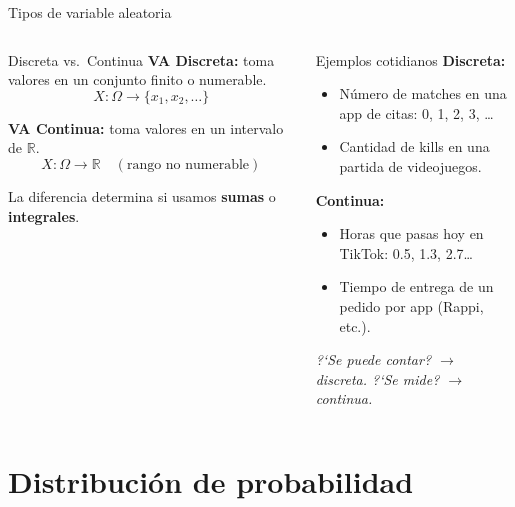 \documentclass[aspectratio=169, 11pt]{beamer}
\begin{document}
\begin{frame}{Tipos de variable aleatoria}
\begin{columns}[T]
\begin{block}{Discreta vs.\ Continua}
\textbf{VA Discreta:} toma valores en un conjunto finito o numerable.
\[
  X: \Omega \to \{x_1, x_2, \dots\}
\]

\vspace{0.3em}
\textbf{VA Continua:} toma valores en un intervalo de $\mathbb{R}$.
\[
  X: \Omega \to \mathbb{R} \quad (\text{rango no numerable})
\]

\vspace{0.3em}
La diferencia determina si usamos \textbf{sumas} o \textbf{integrales}.
\end{block}

\begin{exampleblock}{Ejemplos cotidianos}
\textbf{Discreta:}
\begin{itemize}
  \item N\'umero de matches en una app de citas: 0, 1, 2, 3, \dots
  \item Cantidad de kills en una partida de videojuegos.
\end{itemize}

\vspace{0.5em}
\textbf{Continua:}
\begin{itemize}
  \item Horas que pasas hoy en TikTok: 0.5, 1.3, 2.7\dots
  \item Tiempo de entrega de un pedido por app (Rappi, etc.).
\end{itemize}

\vspace{0.3em}
\textit{?`Se puede contar? $\to$ discreta. ?`Se mide? $\to$ continua.}
\end{exampleblock}
\end{columns}
\end{frame}

\section{Distribuci\'on de probabilidad}
\end{document}
